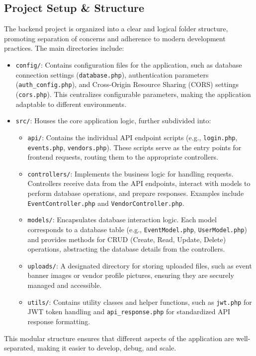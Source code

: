 \documentclass{report}
\begin{document}
\subsection{Project Setup \& Structure}
\label{sec:backend_project_structure}
The backend project is organized into a clear and logical folder structure, promoting separation of concerns and adherence to modern development practices. The main directories include:
\begin{itemize}
    \item \texttt{config/}: Contains configuration files for the application, such as database connection settings (\texttt{database.php}), authentication parameters (\texttt{auth\_config.php}), and Cross-Origin Resource Sharing (CORS) settings (\texttt{cors.php}). This centralizes configurable parameters, making the application adaptable to different environments.
    \item \texttt{src/}: Houses the core application logic, further subdivided into:
    \begin{itemize}
        \item \texttt{api/}: Contains the individual API endpoint scripts (e.g., \texttt{login.php}, \texttt{events.php}, \texttt{vendors.php}). These scripts serve as the entry points for frontend requests, routing them to the appropriate controllers.
        \item \texttt{controllers/}: Implements the business logic for handling requests. Controllers receive data from the API endpoints, interact with models to perform database operations, and prepare responses. Examples include \texttt{EventController.php} and \texttt{VendorController.php}.
        \item \texttt{models/}: Encapsulates database interaction logic. Each model corresponds to a database table (e.g., \texttt{EventModel.php}, \texttt{UserModel.php}) and provides methods for CRUD (Create, Read, Update, Delete) operations, abstracting the database details from the controllers.
        \item \texttt{uploads/}: A designated directory for storing uploaded files, such as event banner images or vendor profile pictures, ensuring they are securely managed and accessible.
        \item \texttt{utils/}: Contains utility classes and helper functions, such as \texttt{jwt.php} for JWT token handling and \texttt{api\_response.php} for standardized API response formatting.
    \end{itemize}
\end{itemize}
This modular structure ensures that different aspects of the application are well-separated, making it easier to develop, debug, and scale.
\end{document}
